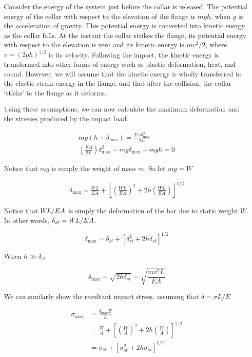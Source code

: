 \documentclass[
10pt,
a4paper,
openany,
svgnames,
]{book} %
\begin{document}
  Consider the energy of the system just before the collar is released. The potential energy of the collar with respect to the elevation of the flange is $mgh$, when $g$ is the acceleration of gravity. This potential energy is converted into kinetic energy as the collar falls. At the instant the collar strikes the flange, its potential energy with respect to the elevation is zero and its kinetic energy is $mv^2/2$, where $v = (2gh)^{1/2}$ is its velocity. Following the impact, the kinetic energy is transformed into other forms of energy such as plastic deformation, heat, and sound. However, we will assume that the kinetic energy is wholly transferred to the elastic strain energy in the flange, and that after the collision, the collar `sticks' to the flange as it deforms.

Using these assumptions, we can now calculate the maximum deformation and the stresses produced by the impact load.

\begin{gather}
  mg(h+ \delta_{\max}) = \frac{EA \delta_{\max}^2}{2L} \nonumber \\
  \left( \frac{EA}{2L} \right) \delta_{\max}^2 - mg \delta_{\max} - mgh = 0 \nonumber
\end{gather}

Notice that $mg$ is simply the weight of mass $m$. So let $mg = W$

\begin{align}
  \delta_{\max} = \frac{WL}{EA} + \left[ \left( \frac{WL}{EA} \right)^2 + 2h \left( \frac{WL}{EA} \right) \right]^{1/2}
\end{align}

Notice that $W\mspace{-2mu}L/EA$ is simply the deformation of the bar due to static weight $W$. In other words, $\delta_{st} = W\mspace{-2mu}L/EA$.

\begin{equation}
  \delta_{\max} = \delta_{st} + \left[ \delta_{st}^2 + 2h\delta_{st} \right]^{1/2}
\end{equation}

When $h \gg \delta_{st}$

\begin{equation}
  \delta_{\max} = \sqrt{2h \delta_{st}} = \sqrt{ \frac{mv^2L}{EA} }
\end{equation}

We can similarly show the resultant impact stress, assuming that $\delta = \sigma L / E$

\begin{align}
  \sigma_{\max} &= \frac{\delta_{\max} E}{L} \nonumber \\
                &= \frac{W}{A} + \left[ \left( \frac{W}{A} \right)^2 + 2h \left( \frac{W}{A} \right) \right]^{1/2} \nonumber \\
                &= \sigma_{st} + \left[ \sigma_{st}^2 + 2h \sigma_{st} \right]^{1/2}
\end{align}
\end{document}
